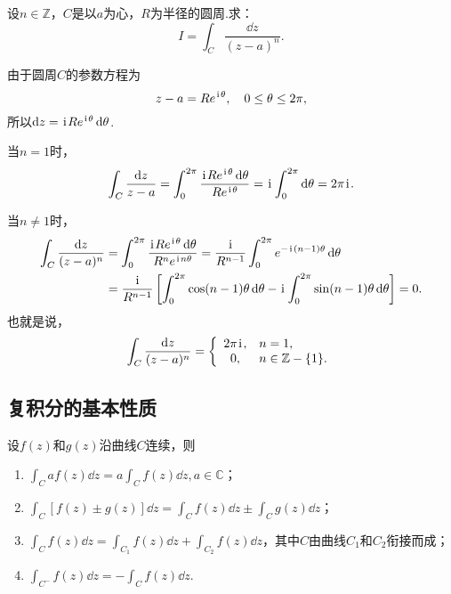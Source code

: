 \begin{example}
设\(n\in\mathbb{Z}\)，\(C\)是以\(a\)为心，\(R\)为半径的圆周.求：\[
I = \int_C \frac{\dd{z}}{(z-a)^n}.
\]
\begin{solution}
由于圆周\(C\)的参数方程为\[
z-a=Re^{\kern1pt\mathrm{i}\kern1pt\theta}, \quad 0 \leq \theta \leq 2\pi,
\]所以\(\dd{z}=\kern1pt\mathrm{i}\kern1pt R e^{\kern1pt\mathrm{i}\kern1pt\theta} \dd{\theta}\).

当\(n=1\)时，\[
\int_C \frac{\dd{z}}{z-a}
= \int_0^{2\pi}{\frac{\kern1pt\mathrm{i}\kern1pt R e^{\kern1pt\mathrm{i}\kern1pt\theta} \dd{\theta}}{R e^{\kern1pt\mathrm{i}\kern1pt\theta}}}
= \kern1pt\mathrm{i}\kern1pt \int_0^{2\pi}\dd{\theta}
= 2\pi\kern1pt\mathrm{i}\kern1pt.
\]

当\(n \neq 1\)时，\begin{align*}
\int_C{\frac{\dd{z}}{(z-a)^n}}
&= \int_0^{2\pi}{
	\frac{
		\kern1pt\mathrm{i}\kern1pt R e^{\kern1pt\mathrm{i}\kern1pt\theta} \dd{\theta}
	}{
		R^n e^{\kern1pt\mathrm{i}\kern1pt n \theta}
	}
}
= \frac{\kern1pt\mathrm{i}\kern1pt}{R^{n-1}} \int_0^{2\pi}{e^{-\kern1pt\mathrm{i}\kern1pt(n-1)\theta}\dd{\theta}} \\
&= \frac{\kern1pt\mathrm{i}\kern1pt}{R^{n-1}} \left[
	\int_0^{2\pi}{\cos(n-1)\theta\dd{\theta}}
	-\kern1pt\mathrm{i}\kern1pt \int_0^{2\pi}{\sin(n-1)\theta\dd{\theta}}
	\right]
= 0.
\end{align*}
也就是说，\begin{equation}\label{equation.解析函数的积分表示.重要积分1}
\int_C \frac{\dd{z}}{(z-a)^n} = \left\{ \begin{array}{cl}
2\pi\kern1pt\mathrm{i}\kern1pt, & n=1, \\
0, & n\in\mathbb{Z}-\{1\}.
\end{array} \right.
\end{equation}
\end{solution}
\end{example}

\subsection{复积分的基本性质}
\begin{property}
设\(f(z)\)和\(g(z)\)沿曲线\(C\)连续，则\begin{enumerate}
\item \(\int_C a f(z) \dd{z} = a \int_C f(z) \dd{z}, a\in\mathbb{C}\)；
\item \(\int_C [f(z) \pm g(z)] \dd{z} = \int_C f(z) \dd{z} \pm \int_C g(z) \dd{z}\)；
\item \(\int_C f(z) \dd{z} = \int_{C_1} f(z) \dd{z} + \int_{C_2} f(z) \dd{z}\)，其中\(C\)由曲线\(C_1\)和\(C_2\)衔接而成；
\item \(\int_{C^-} f(z) \dd{z} = -\int_C f(z) \dd{z}\).
\end{enumerate}
\end{property}


